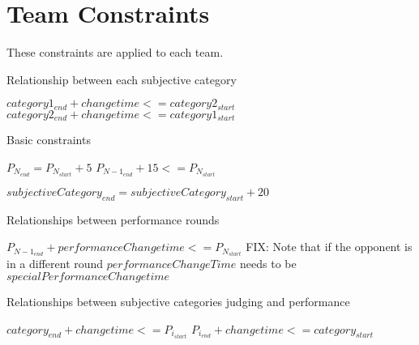 \documentclass[letterpaper,11pt]{report}
\begin{document}
\section{Team Constraints}
These constraints are applied to each team.

\begin{algorithm}
\caption{Relationship between each subjective category}
\begin{algorithmic}
        \STATE $category1_{end} + changetime <= category2_{start}$
      \ELSE
        \STATE $category2_{end} + changetime <= category1_{start}$
      \ENDIF
    \ENDIF
  \ENDFOR
\ENDFOR
\end{algorithmic}
\end{algorithm}

\begin{algorithm}
\caption{Basic constraints}
\begin{algorithmic}
  \STATE $P_{N_{end}} = P_{N_{start}} + 5$
\ENDFOR
{}
  \STATE $P_{{N-1}_{end}} + 15 <= P_{N_{start}}$
\ENDFOR

\STATE $subjectiveCategory_{end} = subjectiveCategory_{start} + 20$
\end{algorithmic}
\end{algorithm}

\begin{algorithm}
\caption{Relationships between performance rounds}
\begin{algorithmic}
  \STATE $P_{{N-1}_{end}} + performanceChangetime <= P_{N_{start}}$ \COMMENT FIX: Note that if the opponent is in a different round $performanceChangeTime$ needs to be $specialPerformanceChangetime$
\ENDFOR
\end{algorithmic}
\end{algorithm}

\begin{algorithm}
\caption{Relationships between subjective categories judging and performance}
\begin{algorithmic}
      \STATE $category_{end} + changetime <= P_{i_{start}}$
    \ELSE
      \STATE $P_{i_{end}} + changetime <= category_{start}$
    \ENDIF
  \ENDFOR
\ENDFOR
\end{algorithmic}
\end{algorithm}
\end{document}
